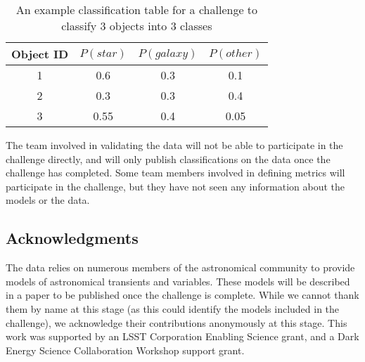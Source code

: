 \documentclass[iop,twocolumn]{emulateapj}
\newcommand{\code}[1]{\texttt{#1}}
\newcommand{\<}      {\langle}
\renewcommand{\>}    {\rangle}
\begin{document}
\begin{table}[htbp!]
\begin{center}
\begin{tabular}{|c|c|c|c|}
Object ID & $P(star)$ & $P(galaxy)$ & $P(other)$ \\
\hline
1 & 0.6 & 0.3 & 0.1\\
2 & 0.3 & 0.3 & 0.4\\
3 & 0.55 & 0.4 & 0.05\\
\end{tabular}
\caption{An example classification table for a challenge to classify 3 objects into 3 classes}
\end{center}
\end{table}

The {\plasticc} team involved in validating the data will not be able to participate in the challenge directly, and will only publish classifications on the data once the challenge has completed. Some {\plasticc} team members involved in defining metrics will participate in the challenge, but they have not seen any {\plasticc} information about the models or the data.


\subsection{Acknowledgments}
The {\plasticc} data relies on numerous members of the astronomical community to provide models of astronomical transients and variables. These models will be described in a paper to be published once the challenge is complete. While we cannot thank them by name at this stage (as this could identify the models included in the challenge), we acknowledge their contributions anonymously at this stage. This work was supported by an LSST Corporation Enabling Science grant, and a Dark Energy Science Collaboration Workshop support grant.



\end{document}
